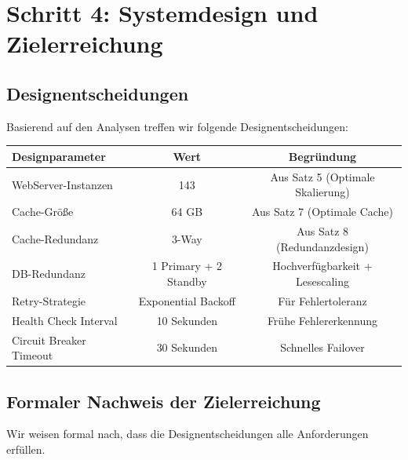 \documentclass[a4paper,11pt]{article}
\theoremstyle{definition}
\begin{document}
\section{Schritt 4: Systemdesign und Zielerreichung}

\subsection{Designentscheidungen}

Basierend auf den Analysen treffen wir folgende Designentscheidungen:

\begin{table}[H]
    \centering
    \begin{tabular}{|l|c|c|}
        \hline
        \textbf{Designparameter} & \textbf{Wert} & \textbf{Begründung} \\
        \hline
        WebServer-Instanzen & 143 & Aus Satz 5 (Optimale Skalierung) \\
        Cache-Größe & 64 GB & Aus Satz 7 (Optimale Cache) \\
        Cache-Redundanz & 3-Way & Aus Satz 8 (Redundanzdesign) \\
        DB-Redundanz & 1 Primary + 2 Standby & Hochverfügbarkeit + Lesescaling \\
        Retry-Strategie & Exponential Backoff & Für Fehlertoleranz \\
        Health Check Interval & 10 Sekunden & Frühe Fehlererkennung \\
        Circuit Breaker Timeout & 30 Sekunden & Schnelles Failover \\
        \hline
    \end{tabular}
\end{table}

\subsection{Formaler Nachweis der Zielerreichung}

Wir weisen formal nach, dass die Designentscheidungen alle Anforderungen erfüllen.
\end{document}
